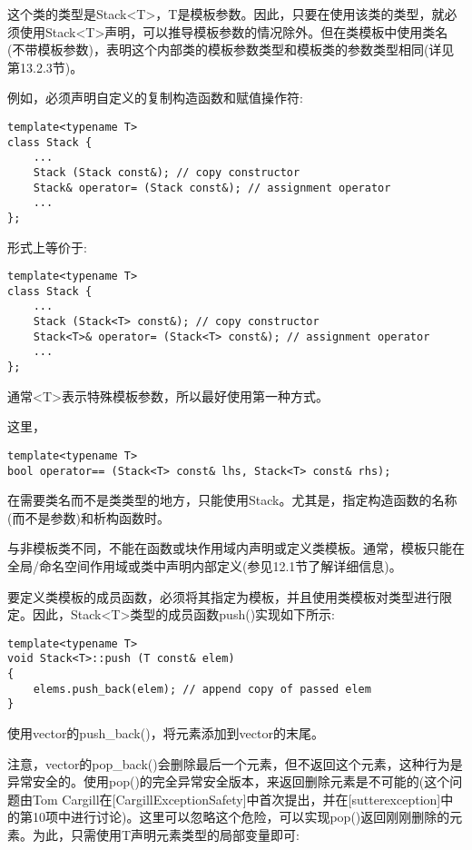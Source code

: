 这个类的类型是Stack<T>，T是模板参数。因此，只要在使用该类的类型，就必须使用Stack<T>声明，可以推导模板参数的情况除外。但在类模板中使用类名(不带模板参数)，表明这个内部类的模板参数类型和模板类的参数类型相同(详见第13.2.3节)。

例如，必须声明自定义的复制构造函数和赋值操作符:

\begin{lstlisting}[style=styleCXX]
template<typename T>
class Stack {
	...
	Stack (Stack const&); // copy constructor
	Stack& operator= (Stack const&); // assignment operator
	...
};
\end{lstlisting}

形式上等价于:

\begin{lstlisting}[style=styleCXX]
template<typename T>
class Stack {
	...
	Stack (Stack<T> const&); // copy constructor
	Stack<T>& operator= (Stack<T> const&); // assignment operator
	...
};
\end{lstlisting}

通常<T>表示特殊模板参数，所以最好使用第一种方式。

这里，

\begin{lstlisting}[style=styleCXX]
template<typename T>
bool operator== (Stack<T> const& lhs, Stack<T> const& rhs);
\end{lstlisting}

在需要类名而不是类类型的地方，只能使用Stack。尤其是，指定构造函数的名称(而不是参数)和析构函数时。

与非模板类不同，不能在函数或块作用域内声明或定义类模板。通常，模板只能在全局/命名空间作用域或类中声明内部定义(参见12.1节了解详细信息)。


要定义类模板的成员函数，必须将其指定为模板，并且使用类模板对类型进行限定。因此，Stack<T>类型的成员函数push()实现如下所示:

\begin{lstlisting}[style=styleCXX]
template<typename T>
void Stack<T>::push (T const& elem)
{
	elems.push_back(elem); // append copy of passed elem
}
\end{lstlisting}

使用vector的push\_back()，将元素添加到vector的末尾。

注意，vector的pop\_back()会删除最后一个元素，但不返回这个元素，这种行为是异常安全的。使用pop()的完全异常安全版本，来返回删除元素是不可能的(这个问题由Tom Cargill在[CargillExceptionSafety]中首次提出，并在[sutterexception]中的第10项中进行讨论)。这里可以忽略这个危险，可以实现pop()返回刚刚删除的元素。为此，只需使用T声明元素类型的局部变量即可:


